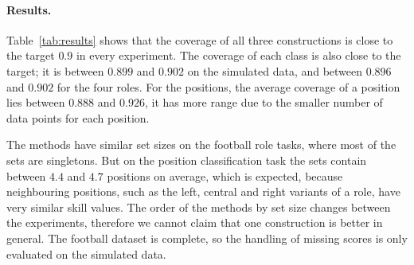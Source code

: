 \paragraph{Results.} Table~\ref{tab:results} shows that the coverage of all three constructions is close to the target 
$0.9$ in every experiment. The coverage of each class is also close to the target; it is between $0.899$ and $0.902$  on 
the simulated data, and between $0.896$ and $0.902$  for the four roles. For the positions, the average coverage of a 
position lies between $0.888$ and $0.926$, it has more range due to the smaller number of data points for each position.

The methods have similar set sizes on the football role tasks, where most of the sets are singletons. But on the position 
classification task the sets contain between $4.4$ and $4.7$ positions on average, which is expected, because neighbouring 
positions, such as the left, central and right variants of a role, have very similar skill values. The order of the methods 
by set size changes between the experiments, therefore we cannot claim that one construction is better in general. The 
football dataset is complete, so the handling of missing scores is only evaluated on the simulated data.